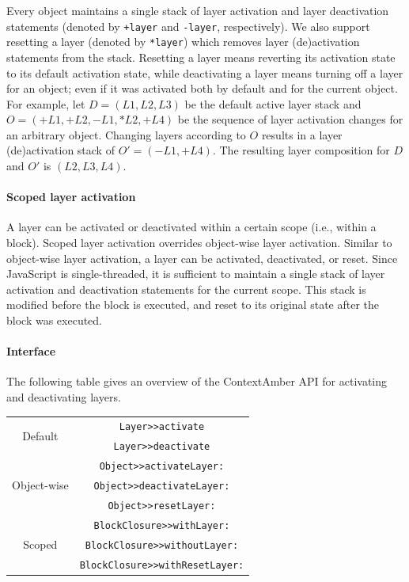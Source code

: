 \documentclass[english,paper=a4,twocolumn=true,DIV=calc,fontsize=9pt]{scrartcl}
\begin{document}
Every object maintains a single stack of layer activation and layer deactivation statements (denoted by \texttt{+layer} and \texttt{-layer}, respectively). We also support resetting a layer (denoted by \texttt{*layer}) which removes layer (de)activation statements from the stack. Resetting a layer means reverting its activation state to its default activation state, while deactivating a layer means turning off a layer for an object; even if it was activated both by default and for the current object. For example, let $D = (L1, L2, L3)$ be the default active layer stack and $O = (+L1, +L2, -L1, *L2, +L4)$ be the sequence of layer activation changes for an arbitrary object. Changing layers according to $O$ results in a layer (de)activation stack of $O' = (-L1, +L4)$. The resulting layer composition for $D$ and $O'$ is $(L2, L3, L4)$.

\paragraph{Scoped layer activation}
A layer can be activated or deactivated within a certain scope (i.e., within a block). Scoped layer activation overrides object-wise layer activation. Similar to object-wise layer activation, a layer can be activated, deactivated, or reset. Since JavaScript is single-threaded, it is sufficient to maintain a single stack of layer activation and deactivation statements for the current scope. This stack is modified before the block is executed, and reset to its original state after the block was executed.

\paragraph{Interface}
The following table gives an overview of the ContextAmber API for activating and deactivating layers.
\begin{table}[h]
\centering
\begin{tabular}{cc}
\multirow{2}{*}{Default} & \texttt{Layer>>activate} \\
 & \texttt{Layer>>deactivate} \\
 \hline
\multirow{3}{*}{Object-wise} & \texttt{Object>>activateLayer:} \\
 & \texttt{Object>>deactivateLayer:} \\
 & \texttt{Object>>resetLayer:} \\
 \hline
\multirow{3}{*}{Scoped} & \texttt{BlockClosure>>withLayer:} \\
 & \texttt{BlockClosure>>withoutLayer:} \\
 & \texttt{BlockClosure>>withResetLayer:} \\
\end{tabular}
\end{table}
\end{document}
